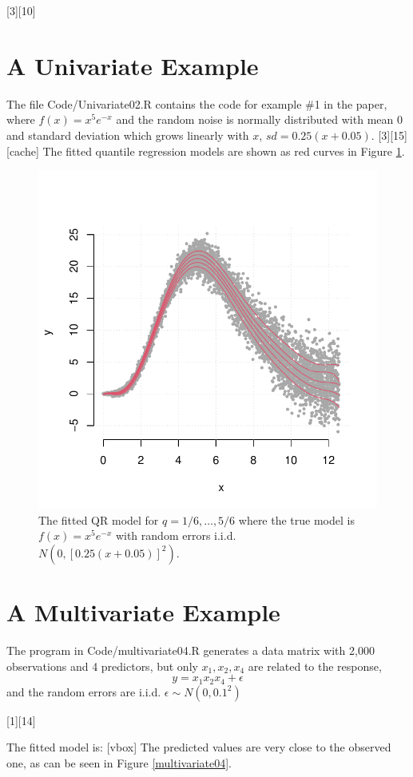 \documentclass[a4paper,12pt]{article}
\begin{document}
[3][10]

\section{A Univariate Example}
The file Code/Univariate02.R  contains the code for example \#1 in the paper, where $f(x)=x^{5}e^{-x}$ and the random noise is normally distributed with mean 0 and standard deviation which grows linearly with $x$, $sd=0.25(x+0.05)$.
[3][15]
[cache]
\noindent The fitted quantile regression models are shown as red curves in Figure \ref{Example1}.

\begin{figure}[b!]
\centering
\includegraphics[width=.6\linewidth]{Figures/Uni02.pdf}
\caption{The fitted QR model for $q=1/6,\ldots,5/6$ where the true model is $f(x)=x^{5}e^{-x}$ with random errors i.i.d. $N(0, [0.25(x+0.05)]^2)$.}\label{Example1}
\end{figure} 
 


\section{A Multivariate Example}
The program in Code/multivariate04.R generates a data matrix with 2,000 observations and 4 predictors, but only $x_1, x_2, x_4$ are related to the response,
$$y = x_1x_2x_4 + \epsilon$$
and the random errors are i.i.d. $\epsilon\sim N(0, 0.1^2)$

[1][14]

The fitted model is: [vbox]
\noindent The predicted values are very close to the observed one, as can be  seen in Figure \ref{multivariate04}.
\end{document}
